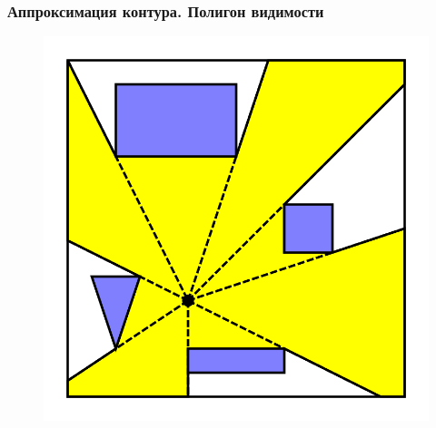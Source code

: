 \documentclass[10pt, unicode]{beamer}
\begin{document}
    \begin{frame}
        \frametitle{Аппроксимация контура. Полигон видимости}
        \begin{figure}[H]
            \centering
            \includegraphics[scale=0.3]{visibility_polygon.png}
        \end{figure}
    \end{frame}
\end{document}
